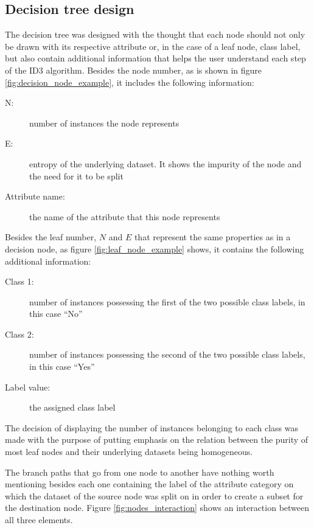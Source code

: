 
\subsection{Decision tree design}
The decision tree was designed with the thought that each node should not only be drawn with its respective attribute or, in the case of a leaf node, class label, but also contain additional information that helps the user understand each step of the ID3 algorithm.
Besides the node number, as is shown in figure \ref{fig:decision_node_example}, it includes the following information:
\begin{description}
    \item[N:] number of instances the node represents
    \item[E:] entropy of the underlying dataset. It shows the impurity of the node and the need for it to be split
    \item[Attribute name:] the name of the attribute that this node represents
\end{description}

Besides the leaf number, $N$ and $E$ that represent the same properties as in a decision node, as figure \ref{fig:leaf_node_example} shows, it contains the following additional information:
\begin{description}
    \item[Class 1:] number of instances possessing the first of the two possible class labels, in this case ``No''
    \item[Class 2:] number of instances possessing the second of the two possible class labels, in this case ``Yes''
    \item[Label value:] the assigned class label
\end{description}
The decision of displaying the number of instances belonging to each class was made with the purpose of putting emphasis on the relation between the purity of most leaf nodes and their underlying datasets being homogeneous.

The branch paths that go from one node to another have nothing worth mentioning besides each one containing the label of the attribute category on which the dataset of the source node was split on in order to create a subset for the destination node.
Figure \ref{fig:nodes_interaction} shows an interaction between all three elements.


